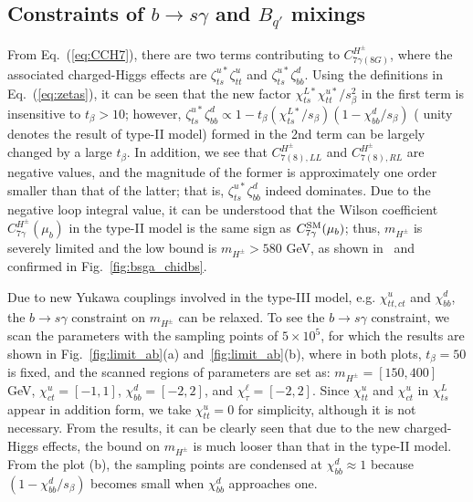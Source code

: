 \documentclass[prd,preprint,superscriptaddress,amsmath,amssymb]{revtex4}
\begin{document}
 
  
  
  \subsection{ Constraints of $b\to s \gamma$ and  $B_{q'}$ mixings}
  
  From Eq.~(\ref{eq:CCH7}), there are two terms contributing to $C^{H^\pm}_{7\gamma(8G)}$, where the associated charged-Higgs effects are $\zeta^{u*}_{ts}\zeta^u_{tt}$ and $\zeta^{u*}_{ts} \zeta^d_{bb}$. Using the definitions in Eq.~(\ref{eq:zetas}), it can be seen that the new factor $\chi^{L*}_{ts} \chi^{u*}_{tt}/s^2_\beta$ in the first term is insensitive to $t_\beta > 10$; however,
$\zeta^{u*}_{ts} \zeta^d_{bb} \propto 1 - t_\beta (\chi^{L*}_{ts}/s_\beta)(1 - \chi^d_{bb}/s_\beta)$ ( unity denotes the result of type-II model) formed in the 2nd term can be largely changed by a large $t_\beta$. In addition, we see that $C^{H^\pm}_{7(8),LL}$ and $C^{H^\pm}_{7(8),RL}$ are negative values, and the magnitude of the former is approximately one order smaller than that of the latter; that is, $\zeta^{u*}_{ts} \zeta^d_{bb}$ indeed dominates. Due to the negative  loop integral value, it can be understood that the Wilson coefficient $C^{H^\pm}_{7\gamma}(\mu_b)$ in the type-II model is the same sign as $C^{\rm SM}_{7\gamma}(\mu_b)$; thus, $m_{H^\pm}$ is severely limited and the low bound is $m_{H^\pm}> 580$ GeV, as shown in~\cite{Misiak:2017bgg} and confirmed in Fig.~\ref{fig:bsga_chidbs}. 
  
 Due to new Yukawa couplings involved in the type-III model, e.g. $\chi^u_{tt,ct}$ and $\chi^d_{bb}$, the $b\to s\gamma$ constraint on $m_{H^\pm}$ can be relaxed. To see the  $b\to s \gamma$ constraint,   we scan the parameters with the sampling points of $5\times 10^{5}$, for which the results are shown in Fig.~\ref{fig:limit_ab}(a) and~\ref{fig:limit_ab}(b), where in both plots, $t_\beta=50$ is fixed, and the scanned regions of parameters are  set as: $m_{H^\pm}=[150, 400]$ GeV, $\chi^u_{ct}=[-1,1]$,  $\chi^d_{bb}=[-2,2]$, and $\chi^\ell_{\tau}=[-2, 2]$. Since $\chi^u_{tt}$ and $\chi^u_{ct}$  in $\chi^L_{ts}$ appear in addition form, we take $\chi^u_{tt}=0$ for simplicity, although it is not necessary.  From the results, it can be clearly seen that due to the new charged-Higgs effects, the bound on $m_{H^\pm}$ is much looser than that in the type-II model.  From the plot (b), the sampling points are condensed at $\chi^d_{bb}\approx 1$ because $(1 - \chi^d_{bb}/s_\beta)$ becomes small when $\chi^d_{bb}$ approaches one. 
  
\end{document}
